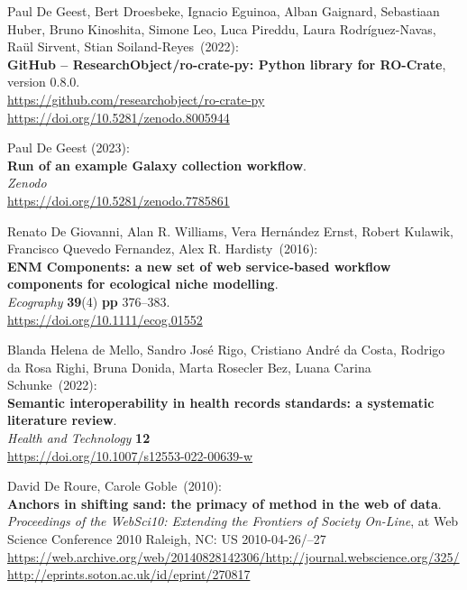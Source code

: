 \begin{thebibliography}{9}
Paul De Geest, Bert Droesbeke, Ignacio Eguinoa, Alban Gaignard, Sebastiaan Huber, Bruno Kinoshita, Simone Leo,
Luca Pireddu, Laura Rodríguez-Navas, Raül Sirvent, Stian Soiland-Reyes~(2022):\\
\textbf{GitHub -- ResearchObject/ro-crate-py: Python library for
RO-Crate}, version 0.8.0.\\
\url{https://github.com/researchobject/ro-crate-py}\\
\url{https://doi.org/10.5281/zenodo.8005944}

Paul De Geest (2023):\\
\textbf{Run of an example Galaxy collection workflow}.\\
\emph{Zenodo}\\
\url{https://doi.org/10.5281/zenodo.7785861}

Renato De Giovanni, Alan R. Williams, Vera Hernández Ernst,
Robert Kulawik, Francisco Quevedo Fernandez, Alex R. Hardisty~(2016):\\
\textbf{ENM Components: a new set of web service‐based workflow
components for ecological niche modelling}.\\
\emph{Ecography}
\textbf{39}(4) \textbf{pp} 376--383.\\
\url{https://doi.org/10.1111/ecog.01552}

Blanda Helena de Mello, Sandro José Rigo, Cristiano
André da Costa, Rodrigo da Rosa Righi, Bruna Donida, Marta Rosecler Bez,
Luana Carina Schunke~(2022):\\
\textbf{Semantic interoperability in health records standards: a
systematic literature review}.\\
\emph{Health and Technology} \textbf{12}\\
\url{https://doi.org/10.1007/s12553-022-00639-w}

David De Roure, Carole Goble~(2010):\\
\textbf{Anchors in shifting sand: the primacy of method in the web of data}. \\
\emph{Proceedings of the WebSci10: Extending the Frontiers of Society On-Line},
at Web Science Conference 2010 Raleigh, NC: US 2010-04-26/--27\\
\url{https://web.archive.org/web/20140828142306/http://journal.webscience.org/325/}\\
\url{http://eprints.soton.ac.uk/id/eprint/270817} 



\end{thebibliography}
